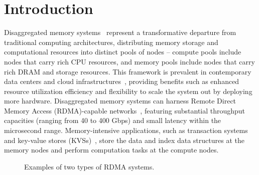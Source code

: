 \vspace{-.5ex}
\section{Introduction}
\label{sec:intro}
\vspace{-0.5ex}

Disaggregated memory systems~\cite{case,tutorial,fusee,shan2022towards,flexchain,rethinking,dex,pang} represent a transformative departure from traditional computing architectures, distributing memory storage and computational resources into distinct pools of nodes -- compute pools include nodes that carry rich CPU resources, and memory pools include nodes that carry rich DRAM and storage resources. This framework is prevalent in contemporary data centers and cloud infrastructures~\cite{redy,zhang2020understanding}, providing benefits such as enhanced resource utilization efficiency and flexibility to scale the system out by deploying more hardware. Disaggregated memory systems can harness Remote Direct Memory Access (RDMA)-capable networks~\cite{farm,clover,dinomo,fusee,redn}, featuring substantial throughput capacities (ranging from 40 to 400 Gbps) and small latency within the microsecond range. 
Memory-intensive applications, such as transaction systems~\cite{ford,drtmr,drtmh,motor} and key-value stores (KVSs)~\cite{race,rolex,herd,farm}, 
store the data and index data structures at the memory nodes and perform computation tasks at the compute nodes. %



\begin{figure}[!t]
\centering
{}
\hspace{-1ex}
\vspace{-3.5ex}
\caption{Examples of two types of RDMA systems.}
\vspace{-4.5ex}
\label{fig:intro}
\end{figure}

